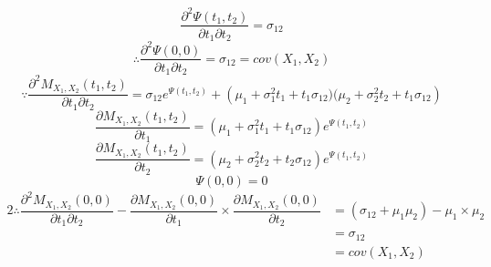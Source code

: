 \documentclass[a4papers]{ctexart}
\begin{document}
\[
    \dfrac{\partial ^{2}\Psi \left( t_{1},t_{2}\right) }{\partial t_1\partial t_2} = \sigma_{12}
\]
\[\therefore  \dfrac{\partial ^{2}\Psi \left( 0,0\right) }{\partial t_1\partial t_2} = \sigma_{12} = cov(X_1,X_2)\]
\[
   \because \dfrac{\partial ^{2}M_{X_1,X_2} \left( t_{1},t_{2}\right) }{\partial t_1\partial t_2}
    = \sigma _{12}e^{\Psi \left( t_{1},t_{2}\right) } + \left( \mu_1+\sigma ^{2}_{1}t_{1}+t_{1}\sigma _{12})(\mu_2+\sigma ^{2}_{2}t_{2}+t_{1}\sigma _{12}\right) 
\]
\[
    \dfrac{\partial M_{X_1,X_2} \left( t_{1},t_{2}\right) }{\partial t_1}
    =\left( \mu_1+\sigma ^{2}_{1}t_{1}+t_{1}\sigma _{12} \right) e^{\Psi \left( t_{1},t_{2}\right) }
\]
\[
    \dfrac{\partial M_{X_1,X_2} \left( t_{1},t_{2}\right) }{\partial t_2}
    =\left( \mu_2+\sigma ^{2}_{2}t_{2}+t_{2}\sigma _{12} \right) e^{\Psi \left( t_{1},t_{2}\right) }
\]
\[ \Psi \left( 0,0 \right) = 0\]
\begin{alignat*}{2}
    \therefore
    \dfrac{\partial ^{2}M_{X_1,X_2} \left( 0,0\right) }{\partial t_1\partial t_2}
    - \dfrac{\partial M_{X_1,X_2} \left(0,0\right) }{\partial t_1}\times
       \dfrac{\partial M_{X_1,X_2} \left( 0,0\right) }{\partial t_2}
    &=(\sigma_{12}+\mu_1\mu_2)-\mu_1\times\mu_2\\
    &=\sigma_{12}\\
    &=cov(X_1,X_2)
\end{alignat*}
\end{document}
